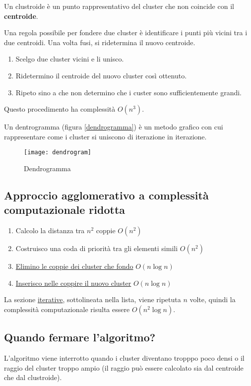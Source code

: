 \documentclass[\main/main.tex]{subfiles}
\begin{document}
\begin{definition}[Clustroide]
  Un clustroide è un punto rappresentativo del cluster che non coincide con il \textbf{centroide}.
\end{definition}

Una regola possibile per fondere due cluster è identificare i punti più vicini tra i due centroidi. Una volta fusi, si ridetermina il nuovo centroide.

\begin{enumerate}
  \item Scelgo due cluster vicini e li unisco.
  \item Ridetermino il centroide del nuovo cluster così ottenuto.
  \item Ripeto sino a che non determino che i custer sono sufficientemente grandi.
\end{enumerate}

Questo procedimento ha complessità $O(n^3)$.

\begin{definition}[Dendrogramma]
  Un dentrogramma (figura \ref{dendrogramma}) è un metodo grafico con cui rappresentare come i cluster si uniscono di iterazione in iterazione.
  \begin{figure}[H]
    \centering
    \texttt{[image: dendrogram]}
    \caption{Dendrogramma}
    \label{dendrogram}
  \end{figure}
\end{definition}

\subsection{Approccio agglomerativo a complessità computazionale ridotta}

\begin{enumerate}
  \item Calcolo la distanza tra $n^2$ coppie \dotfill \textbf{$O(n^2)$}
  \item Costruisco una coda di priorità tra gli elementi simili \dotfill \textbf{$O(n^2)$}
  \item \underline{Elimino le coppie dei cluster che fondo} \dotfill \textbf{$O(n\log n)$}
  \item \underline{Inserisco nelle coppire il nuovo cluster} \dotfill \textbf{$O(n\log n)$}
\end{enumerate}

La sezione \underline{iterative}, sottolineata nella lista, viene ripetuta $n$ volte, quindi la complessità computazionale risulta essere $O(n^2\log n)$.

\subsection{Quando fermare l'algoritmo?}
L'algoritmo viene interrotto quando i cluster diventano tropppo poco densi o il raggio del cluster troppo ampio (il raggio può essere calcolato sia dal centroide che dal clustroide).
\end{document}
